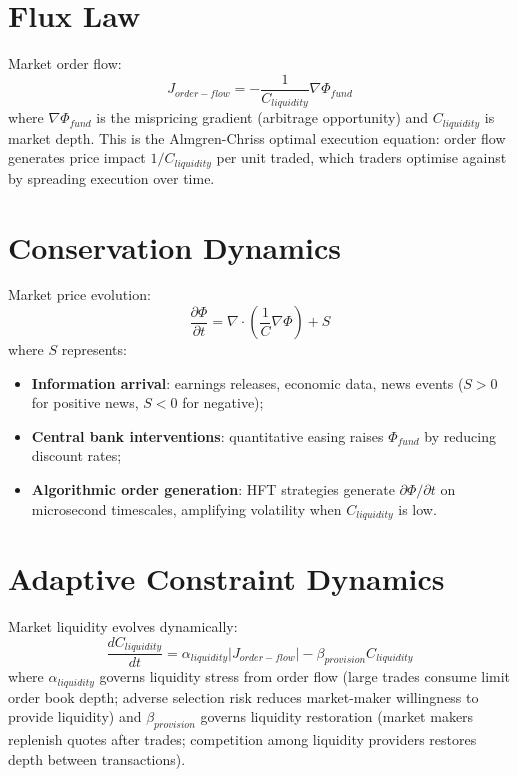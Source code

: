 \documentclass[11pt]{article}
\begin{document}
\section{Flux Law}

Market order flow:
\begin{equation}
J_{order-flow} = -\frac{1}{C_{liquidity}}\nabla \Phi_{fund}
\end{equation}
where $\nabla\Phi_{fund}$ is the mispricing gradient (arbitrage opportunity) and $C_{liquidity}$
is market depth. This is the Almgren-Chriss optimal execution equation: order flow generates
price impact $1/C_{liquidity}$ per unit traded, which traders optimise against by spreading
execution over time.

\section{Conservation Dynamics}

Market price evolution:
\begin{equation}
\frac{\partial \Phi}{\partial t} = \nabla \cdot \left(\frac{1}{C}\nabla \Phi\right) + S
\end{equation}
where $S$ represents:
\begin{itemize}
    \item \textbf{Information arrival}: earnings releases, economic data, news events ($S > 0$
          for positive news, $S < 0$ for negative);
    \item \textbf{Central bank interventions}: quantitative easing raises $\Phi_{fund}$ by reducing
          discount rates;
    \item \textbf{Algorithmic order generation}: HFT strategies generate $\partial\Phi/\partial t$
          on microsecond timescales, amplifying volatility when $C_{liquidity}$ is low.
\end{itemize}

\section{Adaptive Constraint Dynamics}

Market liquidity evolves dynamically:
\begin{equation}
\frac{dC_{liquidity}}{dt} = \alpha_{liquidity}|J_{order-flow}| - \beta_{provision} C_{liquidity}
\end{equation}
where $\alpha_{liquidity}$ governs liquidity stress from order flow (large trades consume limit
order book depth; adverse selection risk reduces market-maker willingness to provide liquidity)
and $\beta_{provision}$ governs liquidity restoration (market makers replenish quotes after
trades; competition among liquidity providers restores depth between transactions).
\end{document}
